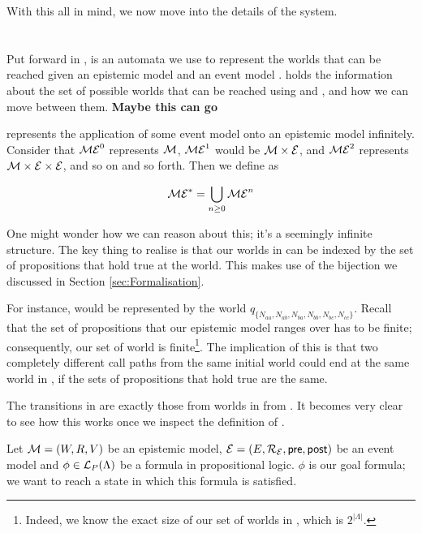 \documentclass[10pt, a4paper]{report}
\begin{document}
With this all in mind, we now move into the details of the system.

\section{\mestar}
\label{sec:mestar}

Put forward in \cite{AutomataTechniques}, \mestar is an automata we use to
represent the worlds that can be reached given an epistemic model  and an
event model . \mestar holds the information about the set of possible
worlds that can be reached using  and , and how we can move
between them. \textbf{Maybe this can go}

\mestar represents the application of some event model  onto an epistemic
model  infinitely. Consider that $\mathcal{ME}^0$ represents $\mathcal{M}$,
$\mathcal{ME}^1$ would be $\mathcal{M} \times \mathcal{E}$, and $\mathcal{ME}^2$ represents $\mathcal{M}
\times \mathcal{E} \times \mathcal{E}$, and so on and so forth. Then we define \mestar as

\begin{equation*}
  \mathcal{ME}^\ast = \bigcup_{n \geq 0} \mathcal{ME}^n
\end{equation*}

One might wonder how we can reason about this; it's a seemingly infinite
structure. The key thing to realise is that our worlds in \mestar can be indexed by
the set of propositions that hold true at the world. This makes use of the
bijection we discussed in Section \ref{sec:Formalisation}.

For instance,  would be represented by the world
$q_{\{N_{aa}, N_{ab}, N_{ba}, N_{bb}, N_{bc}, N_{cc}\}}$. Recall that the set of
propositions that our epistemic model ranges over has to be finite;
consequently, our set of world is finite\footnote{Indeed, we know the exact
  size of our set of worlds in \mestar, which is $2^{|\Lambda|}$.}. The
implication of this is that two completely different call paths from the same
initial world could end at the same world in \mestar, if the sets of
propositions that hold true are the same.

The transitions in \mestar are exactly
those from worlds in  from . It becomes very clear to see how this
works once we inspect the definition of \mestar.

\bigskip 

Let $\mathcal{M} = (W, R, V)$ be an epistemic model, $\mathcal{E} = (E, \mathcal{R_E}, \textsf{pre},
\textsf{post})$ be an event model and $\phi \in \mathcal{L}_P(\Lambda)$ be a formula in
propositional logic. $\phi$ is our goal formula; we want to reach a state in which
this formula is satisfied. 
\end{document}
